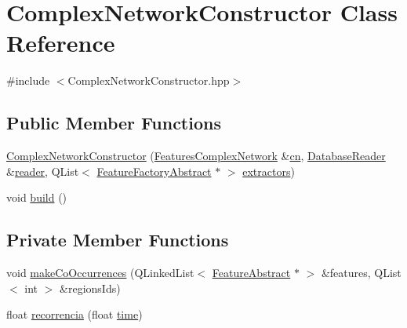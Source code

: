 \hypertarget{class_complex_network_constructor}{\section{Complex\+Network\+Constructor Class Reference}
\label{class_complex_network_constructor}
}


{\ttfamily \#include $<$Complex\+Network\+Constructor.\+hpp$>$}

\subsection*{Public Member Functions}
\begin{DoxyCompactItemize}
\item 
\hyperlink{class_complex_network_constructor_afe14ec2655225f646877381c87b86df3}{Complex\+Network\+Constructor} (\hyperlink{class_features_complex_network}{Features\+Complex\+Network} \&\hyperlink{class_complex_network_constructor_aa099456a58edc5c1885323061206b3e6}{cn}, \hyperlink{class_database_reader}{Database\+Reader} \&\hyperlink{class_complex_network_constructor_ad223ad7e464ff159d91a89deb4e943cc}{reader}, Q\+List$<$ \hyperlink{class_feature_factory_abstract}{Feature\+Factory\+Abstract} $\ast$ $>$ \hyperlink{class_complex_network_constructor_ae79b538a8b9253cd71de5fef1be1c18a}{extractors})
\item 
void \hyperlink{class_complex_network_constructor_a19d313488e2c19172e362b521f53e329}{build} ()
\end{DoxyCompactItemize}
\subsection*{Private Member Functions}
\begin{DoxyCompactItemize}
\item 
void \hyperlink{class_complex_network_constructor_aa41263b4bf0e157d451652d772f84ef7}{make\+Co\+Occurrences} (Q\+Linked\+List$<$ \hyperlink{class_feature_abstract}{Feature\+Abstract} $\ast$ $>$ \&features, Q\+List$<$ int $>$ \&regions\+Ids)
\item 
float \hyperlink{class_complex_network_constructor_a8c4875120270d689a5fd08e47a6b4b59}{recorrencia} (float \hyperlink{class_complex_network_constructor_afc016404ca7dda4b05807e3ca004c308}{time})
\end{DoxyCompactItemize}
